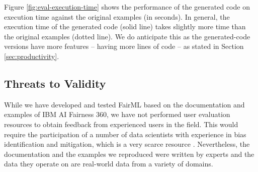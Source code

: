 \documentclass[sigconf,review]{acmart}
\begin{document}
{	Figure \ref{fig:eval-execution-time} shows the performance of the generated code on execution time against the original examples (in seconds). In general, the execution time of the generated code (solid line) takes slightly more time than the original examples (dotted line). 
	We do anticipate this as the generated-code versions have more features -- having more lines of code --
	as stated in Section \ref{sec:productivity}. 
	
	
	\subsection{Threats to Validity}
	\label{sec:threats_to_validity}	
	While we have developed and tested FairML based on the documentation and examples of IBM AI Fairness 360, we have not performed user evaluation resources to obtain feedback from experienced users in the field. This would require the participation of a number of data scientists with experience in bias identification and mitigation, which is a very scarce resource \cite{lee2021landscape}. Nevertheless, the documentation and the examples we reproduced were written by experts and the data they operate on are real-world data from a variety of domains.
	
}
\end{document}
